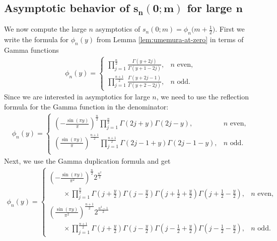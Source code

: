 \documentclass[pdftex]{sigma}
\numberwithin{equation}{section}
\begin{document}
\subsection[Asymptotic behavior of s\_n(0;m) for large n]{Asymptotic behavior of $\boldsymbol{s_n(0;m)}$ for large $\boldsymbol{n}$}
We now compute the large $n$ asymptotics of $s_n(0;m)=\phi_n\big(m+\frac{1}{2}\big)$. First we write the formula for $\phi_n(y)$ from Lemma \ref{lem:umemura-at-zero} in terms of Gamma functions
\begin{gather*}
\phi_{n}(y)=\begin{cases}\displaystyle
 \mathop{\prod}\limits_{j=1}^{\frac{n}{2}}\frac{\Gamma(y+2j)}{\Gamma(y+1-2j)},& \text{$n$ even},\\
 \displaystyle \mathop{\prod}\limits_{j=1}^{\frac{n+1}{2}}\frac{\Gamma(y+2j-1)}{\Gamma(y+2-2j)},& \text{$n$ odd.}
\end{cases}
\end{gather*}
Since we are interested in asymptotics for large $n$, we need to use the reflection formula for the Gamma function \cite[equation~(5.5.3)]{DLMF} in the denominator:
\begin{gather*}
\phi_{n}(y)=\begin{cases} \displaystyle
 \left(-\frac{\sin(\pi y)}{\pi}\right)^\frac{n}{2} \mathop{\prod}\limits_{j=1}^{\frac{n}{2}}{\Gamma(2j+y)\Gamma(2j-y)},& \text{$n$ even},\\
 \displaystyle \left(\frac{\sin(\pi y)}{\pi}\right)^\frac{n+1}{2}\mathop{\prod}\limits_{j=1}^{\frac{n+1}{2}}{\Gamma(2j-1+y)\Gamma(2j-1-y)},& \text{$n$ odd.}\\
\end{cases}
\end{gather*}
Next, we use the Gamma duplication formula \cite[equation~(5.5.5)]{DLMF} and get
\begin{gather*}
\phi_{n}(y)=
\begin{cases} \displaystyle
 \left(-\frac{\sin(\pi y)}{\pi^2}\right)^\frac{n}{2} 2^\frac{n^2}{2}
\\
 \qquad \displaystyle{}\times\prod\limits_{j=1}^{\frac{n}{2}}\Gamma\left(j+\frac{y}{2}\right)
 \Gamma\left(j-\frac{y}{2}\right)\Gamma\left(j+\frac12+\frac{y}{2}\right)\Gamma\left(j+\frac12-\frac{y}{2}\right),& \text{$n$ even,}\\
 \displaystyle \left(\frac{\sin(\pi y)}{\pi^2}\right)^\frac{n+1}{2}2^\frac{n^2-1}{2}
\\
 \qquad \displaystyle{} \times\prod \limits_{j=1}^{\frac{n+1}{2}}\Gamma\left(j+\frac{y}{2}\right)
 \Gamma\left(j-\frac{y}{2}\right)\Gamma\left(j-\frac12+\frac{y}{2}\right)\Gamma\left(j-\frac12-\frac{y}{2}\right),& \text{$n$ odd.}
 \end{cases}
\end{gather*}
\end{document}
